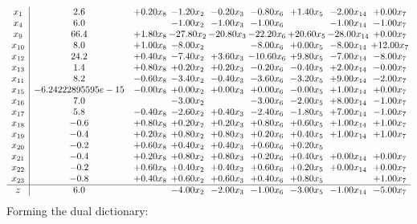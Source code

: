 \documentclass[8pt]{article}
\begin{document}
\[\begin{array}{c| c c@{\hskip 2pt} c@{\hskip 2pt} c@{\hskip 2pt} c@{\hskip 2pt} c@{\hskip 2pt} c@{\hskip 2pt} c@{\hskip 2pt} }
 x_{1}   &  2.6 & +  0.20 x_{8} & -1.20 x_{2} & -0.20 x_{3} & -0.80 x_{6} & +  1.40 x_{5} & -2.00 x_{14} & +  0.00 x_{7}\\
 x_{4}   &  6.0  &   & -1.00 x_{2} & -1.00 x_{3} & -1.00 x_{6} &   & -1.00 x_{14} & -1.00 x_{7}\\
 x_{9}   &  66.4 & +  1.80 x_{8} & -27.80 x_{2} & -20.80 x_{3} & -22.20 x_{6} & + 20.60 x_{5} & -28.00 x_{14} & +  0.00 x_{7}\\
 x_{10}   &  8.0 & +  1.00 x_{8} & -8.00 x_{2} &   & -8.00 x_{6} & +  0.00 x_{5} & -8.00 x_{14} & + 12.00 x_{7}\\
 x_{12}   &  24.2 & +  0.40 x_{8} & -7.40 x_{2} & +  3.60 x_{3} & -10.60 x_{6} & +  9.80 x_{5} & -7.00 x_{14} & -8.00 x_{7}\\
 x_{13}   &  1.4 & +  0.80 x_{8} & +  0.20 x_{2} & +  0.20 x_{3} & -0.20 x_{6} & -0.40 x_{5} & +  2.00 x_{14} & -0.00 x_{7}\\
 x_{11}   &  8.2 & -0.60 x_{8} & -3.40 x_{2} & -0.40 x_{3} & -3.60 x_{6} & -3.20 x_{5} & +  9.00 x_{14} & -2.00 x_{7}\\
 x_{15}   &  -6.24222895595e-15 & -0.00 x_{8} & +  0.00 x_{2} & +  0.00 x_{3} & +  0.00 x_{6} & -0.00 x_{5} & +  1.00 x_{14} & +  0.00 x_{7}\\
 x_{16}   &  7.0  &   & -3.00 x_{2} &   & -3.00 x_{6} & -2.00 x_{5} & +  8.00 x_{14} & -1.00 x_{7}\\
 x_{17}   &  5.8 & -0.40 x_{8} & -2.60 x_{2} & +  0.40 x_{3} & -2.40 x_{6} & -1.80 x_{5} & +  7.00 x_{14} & -1.00 x_{7}\\
 x_{18}   &  -0.6 & +  0.80 x_{8} & +  0.20 x_{2} & +  0.20 x_{3} & +  0.80 x_{6} & +  0.60 x_{5} & +  1.00 x_{14} & +  1.00 x_{7}\\
 x_{19}   &  -0.4 & +  0.20 x_{8} & +  0.80 x_{2} & +  0.80 x_{3} & +  0.20 x_{6} & +  0.40 x_{5} & +  1.00 x_{14} & +  1.00 x_{7}\\
 x_{20}   &  -0.2 & +  0.60 x_{8} & +  0.40 x_{2} & +  0.40 x_{3} & +  0.60 x_{6} & +  0.20 x_{5} &    &   \\
 x_{21}   &  -0.4 & +  0.20 x_{8} & +  0.80 x_{2} & +  0.80 x_{3} & +  0.20 x_{6} & +  0.40 x_{5} & +  0.00 x_{14} & +  0.00 x_{7}\\
 x_{22}   &  -0.2 & +  0.60 x_{8} & +  0.40 x_{2} & +  0.40 x_{3} & +  0.60 x_{6} & +  0.20 x_{5} & +  0.00 x_{14} & +  0.00 x_{7}\\
 x_{23}   &  -0.8 & +  0.40 x_{8} & +  0.60 x_{2} & +  0.60 x_{3} & +  0.40 x_{6} & +  0.80 x_{5} &   & +  1.00 x_{7}\\
\hline
z    &  6.0  &   & -4.00 x_{2} & -2.00 x_{3} & -1.00 x_{6} & -3.00 x_{5} & -1.00 x_{14} & -5.00 x_{7}\\
\end{array}\]
Forming the dual dictionary:
\end{document}
